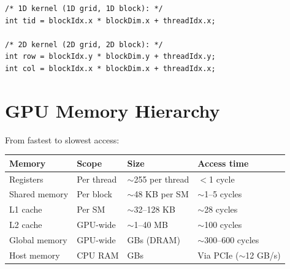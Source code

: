 \documentclass[12pt,a4paper]{article}
\begin{document}
\begin{lstlisting}
/* 1D kernel (1D grid, 1D block): */
int tid = blockIdx.x * blockDim.x + threadIdx.x;

/* 2D kernel (2D grid, 2D block): */
int row = blockIdx.y * blockDim.y + threadIdx.y;
int col = blockIdx.x * blockDim.x + threadIdx.x;
\end{lstlisting}

\begin{center}
\end{center}

\section{GPU Memory Hierarchy}

From fastest to slowest access:

\begin{center}
\begin{tabular}{lllp{4.5cm}}
\toprule
Memory & Scope & Size & Access time \\
\midrule
Registers & Per thread & $\sim$255 per thread & $<$1 cycle \\
Shared memory & Per block & $\sim$48 KB per SM & $\sim$1--5 cycles \\
L1 cache & Per SM & $\sim$32--128 KB & $\sim$28 cycles \\
L2 cache & GPU-wide & $\sim$1--40 MB & $\sim$100 cycles \\
Global memory & GPU-wide & GBs (DRAM) & $\sim$300--600 cycles \\
Host memory & CPU RAM & GBs & Via PCIe ($\sim$12 GB/s) \\
\bottomrule
\end{tabular}
\end{center}
\end{document}
